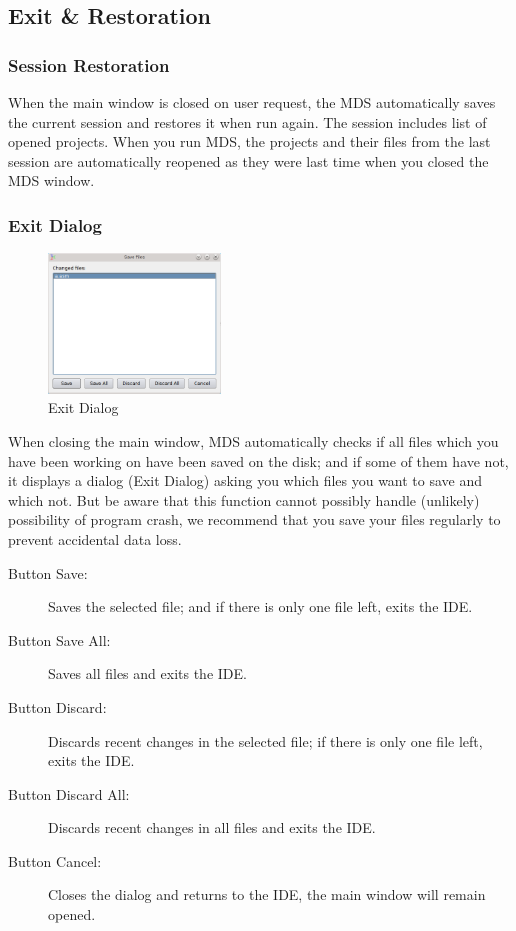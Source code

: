     \clearpage
    \subsection{Exit \& Restoration}
        \subsubsection{Session Restoration}
            When the main window is closed on user request, the MDS automatically saves the current session and restores it when run again. The session includes list of opened projects. When you run MDS, the projects and their files from the last session are automatically reopened as they were last time when you closed the MDS window.

        \subsubsection{Exit Dialog}
            \begin{figure}
                \centering
                \includegraphics[width=130pt]{img/exit_dialog.png}
                \caption{Exit Dialog}
            \end{figure}

            When closing the main window, MDS automatically checks if all files which you have been working on have been saved on the disk; and if some of them have not, it displays a dialog (Exit Dialog) asking you which files you want to save and which not. But be aware that this function cannot possibly handle (unlikely) possibility of program crash, we recommend that you save your files regularly to prevent accidental data loss.

            \begin{description}
                \item[Button Save:] Saves the selected file; and if there is only one file left, exits the IDE.
                \item[Button Save All:] Saves all files and exits the IDE.
                \item[Button Discard:] Discards recent changes in the selected file; if there is only one file left, exits the IDE.
                \item[Button Discard All:] Discards recent changes in all files and exits the IDE.
                \item[Button Cancel:] Closes the dialog and returns to the IDE, the main window will remain opened.
            \end{description}

